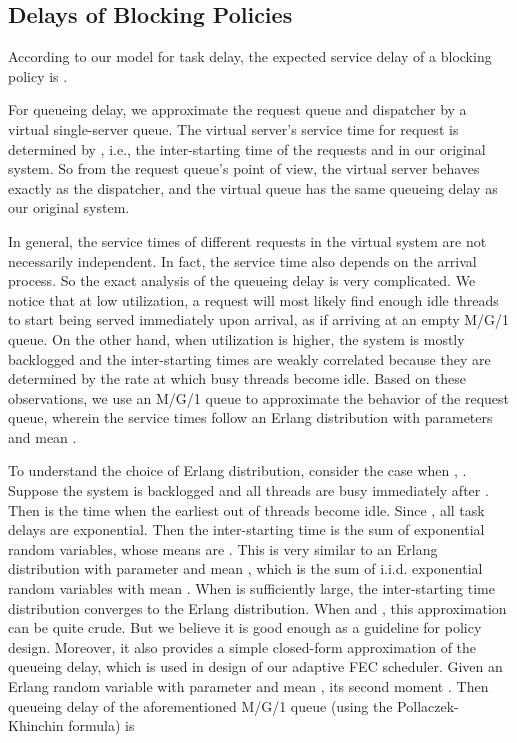 \documentclass[journal]{IEEEtran}
\begin{document}
\subsection{Delays of Blocking Policies}
According to our model for task delay, the expected service delay of a blocking policy is .

For queueing delay, we approximate the request queue and dispatcher by a virtual single-server queue. The virtual server's service time for request  is determined by , i.e., the inter-starting time of the requests  and  in our original system. So from the request queue's point of view, the virtual server behaves exactly as the dispatcher, and the virtual queue has the same queueing delay as our original system.

In general, the service times of different requests in the virtual system are not necessarily independent. In fact, the service time also depends on the arrival process. 
So the exact analysis of the queueing delay is very complicated. 
We notice that at low utilization, a request will most likely find enough idle threads to start being served immediately upon arrival, as if arriving at an empty M/G/1 queue. On the other hand, when utilization is higher, the system is mostly backlogged and the inter-starting times are weakly correlated because they are determined by the rate at which busy threads become idle. Based on these observations, we use an M/G/1 queue to approximate the behavior of the request queue, wherein the service times follow an Erlang distribution with parameters  and mean . 


To understand the choice of Erlang distribution, consider the case when , .
Suppose the system is backlogged and all  threads are busy immediately after . Then  is the time when the earliest  out of  threads become idle. Since , all task delays are exponential. Then the inter-starting time is the sum of  exponential random variables, whose means are . This is very similar to an Erlang distribution with parameter  and mean , which is the sum of  i.i.d. exponential random variables with mean . When  is sufficiently large, the inter-starting time distribution converges to the Erlang distribution.
When  and , this approximation can be quite crude. But we believe it is good enough as a guideline for policy design. Moreover, it also provides a simple closed-form approximation of the queueing delay, which is used in design of our adaptive FEC scheduler. 
Given an Erlang random variable   with parameter  and mean , its second moment . Then queueing delay of the aforementioned M/G/1 queue (using the Pollaczek-Khinchin formula) is
\end{document}
